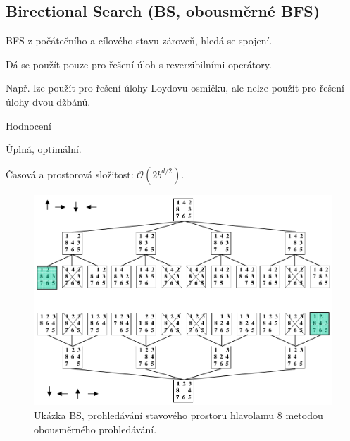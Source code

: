 \subsection{Birectional Search (BS, obousměrné BFS)}

\begin{compactitem}
    \item BFS z počátečního a cílového stavu zároveň, hledá se spojení.
    \item Dá se použít pouze pro řešení úloh s reverzibilními operátory.
    \begin{compactitem}
        \item Např. lze použít pro řešení úlohy Loydovu osmičku, ale nelze použít pro řešení úlohy dvou džbánů.
    \end{compactitem}

    \item Hodnocení \begin{compactitem}
        \item Úplná, optimální.
        \item Časová a prostorová složitost: $\mathcal{O}(2b^{d / 2})$.
    \end{compactitem}

    \begin{figure}[H]
        \centering
        \includegraphics[width=1\linewidth]{bs.png}
        \caption{Ukázka BS, prohledávání stavového prostoru hlavolamu 8 metodou obousměrného prohledávání.}
    \end{figure}
\end{compactitem}


